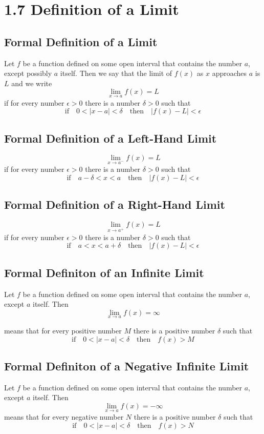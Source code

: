 %
%

\section*{1.7 Definition of a Limit}

\subsection*{Formal Definition of a Limit}

Let \(f\) be a function defined on some open interval that contains the number \(a\), except possibly \(a\) itself. Then we say that the limit of \(f(x)\) as \(x\) approaches \(a\) is \(L\) and we write
$$\lim_{x \to a}f(x)=L$$
if for every number \(\epsilon > 0\) there is a number \(\delta > 0\) such that
$$\text{if} \quad 0<|x-a|<\delta \quad \text{then} \quad |f(x)-L|<\epsilon$$

\subsection*{Formal Definition of a Left-Hand Limit}

$$\lim_{x \to a^-}f(x)=L$$
if for every number \(\epsilon > 0\) there is a number \(\delta > 0\) such that 
$$\text{if} \quad a-\delta<x<a \quad \text{then} \quad |f(x)-L|<\epsilon$$ 

\subsection*{Formal Definition of a Right-Hand Limit}

$$\lim_{x \to a^+}f(x)=L$$
if for every number \(\epsilon > 0\) there is a number \(\delta > 0\) such that 
$$\text{if} \quad a<x<a+\delta \quad \text{then} \quad |f(x)-L|<\epsilon$$ 

\subsection*{Formal Definiton of an Infinite Limit}

Let \(f\) be a function defined on some open interval that contains the number \(a\), except \(a\) itself. Then
$$\lim_{x \to a}f(x)=\infty$$

means that for every positive number \(M\) there is a positive number \(\delta\) such that 
$$\text{if} \quad 0<|x-a|<\delta \quad \text{then} \quad f(x)>M$$


\subsection*{Formal Definiton of a Negative Infinite Limit}

Let \(f\) be a function defined on some open interval that contains the number \(a\), except \(a\) itself. Then
$$\lim_{x \to a}f(x)=-\infty$$
means that for every negative number \(N\) there is a positive number \(\delta\) such that 
$$\text{if} \quad 0<|x-a|<\delta \quad \text{then} \quad f(x)>N$$

